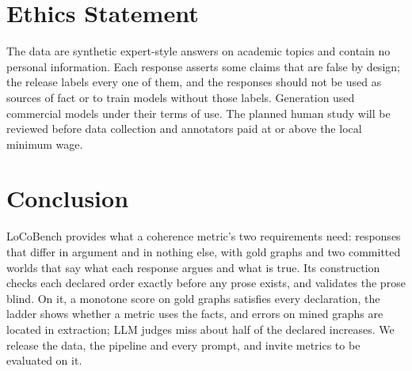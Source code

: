 \documentclass[11pt]{article}
\begin{document}
\section*{Ethics Statement}

The data are synthetic expert-style answers on academic topics and contain no personal
information. Each response asserts some claims that are false by design; the release labels every
one of them, and the responses should not be used as sources of fact or to train models without
those labels. Generation used commercial models under their terms of use. The planned human study
will be reviewed before data collection and annotators paid at or above the local minimum wage.

\section{Conclusion}

LoCoBench provides what a coherence metric's two requirements need: responses that differ in
argument and in nothing else, with gold graphs and two committed worlds that say what each
response argues and what is true. Its construction checks each declared order exactly before any
prose exists, and validates the prose blind. On it, a monotone score on gold graphs satisfies
every declaration, the  ladder shows whether a metric uses the facts, and errors on mined
graphs are located in extraction; LLM judges miss about half of the declared increases. We release
the data, the pipeline and every prompt, and invite metrics to be evaluated on it.



\appendix

\end{document}
